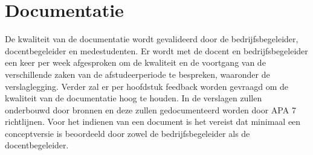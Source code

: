 \section{Documentatie}
De kwaliteit van de documentatie wordt gevalideerd door de bedrijfsbegeleider, docentbegeleider en medestudenten.
Er wordt met de docent en bedrijfsbegeleider een keer per week afgesproken om de kwaliteit en de voortgang van de verschillende zaken van de afstudeerperiode te bespreken, waaronder de verslaglegging.
Verder zal er per hoofdstuk feedback worden gevraagd om de kwaliteit van de documentatie hoog te houden.
In de verslagen zullen onderbouwd door bronnen en deze zullen gedocumenteerd worden door APA 7 \Parencite{APA7} richtlijnen.
Voor het indienen van een document is het vereist dat minimaal een conceptversie is beoordeeld door zowel de bedrijfsbegeleider als de docentbegeleider.

